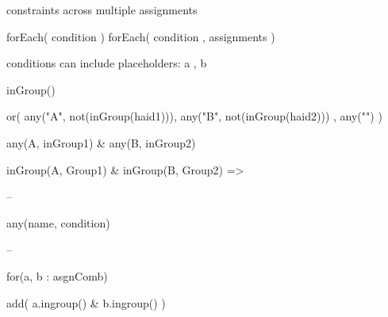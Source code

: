 constraints across multiple assignments

forEach( condition )
forEach( condition , assignments )



conditions can include placeholders: a , b

inGroup()

or( any("A", not(inGroup(haid1))), any("B", not(inGroup(haid2))) , any("") )


any(A, inGroup1) \& any(B, inGroup2)

inGroup(A, Group1) \& inGroup(B, Group2) => 

--

any(name, condition)


--

for(a, b : asgnComb)

  add( a.ingroup() \& b.ingroup() )